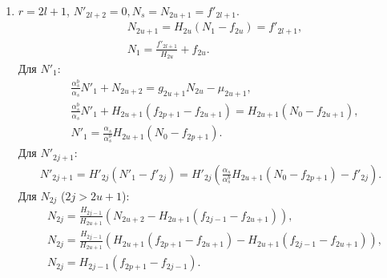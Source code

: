 \begin{enumerate}
\begin{enumerate}
\begin{enumerate}
            \item \( r=2l+1 \), \( N'_{2l+2} = 0, N_s = N_{2u+1} = f'_{2l+1} \).
            \begin{equation*}
                \begin{split}
                    & N_{2u+1} = H_{2u} (N_1 - f_{2u}) = f'_{2l+1}, \\
                    & N_1 = \frac{f'_{2l+1}}{H_{2u}} + f_{2u}.
                \end{split}
            \end{equation*}
            Для \(N'_{1}\):
            \begin{equation*}
                \begin{split}
                    & \frac{\alpha^b_s}{\alpha_s} N'_1 + N_{2u+2} = g_{2u+1} N_{2u} - \mu_{2u+1}, \\
                    & \frac{\alpha^b_s}{\alpha_s} N'_1 + H_{2u+1} (f_{2p+1} - f_{2u+1}) = H_{2u+1} (N_0 - f_{2u+1}), \\
                    & N'_1 = \frac{\alpha_s}{\alpha^b_s} H_{2u+1} (N_0 - f_{2p+1}).
                \end{split}
            \end{equation*}
            Для \(N'_{2j+1}\):
            \begin{equation*}
                \begin{split}
                    N'_{2j+1} = H'_{2j} (N'_1 - f'_{2j}) = H'_{2j} \left( \frac{\alpha_s}{\alpha^b_s} H_{2u+1} (N_0 - f_{2p+1}) - f'_{2j} \right).
                \end{split}
            \end{equation*}
            Для \(N_{2j}\) (\(2j > 2u+1\)):
            \begin{equation*}
                \begin{split}
                    & N_{2j} = \frac{H_{2j-1}}{H_{2u+1}} \left( N_{2u+2} - H_{2u+1} (f_{2j-1} - f_{2u+1}) \right), \\
                    & N_{2j} = \frac{H_{2j-1}}{H_{2u+1}} \left( H_{2u+1} (f_{2p+1} - f_{2u+1}) - H_{2u+1} (f_{2j-1} - f_{2u+1}) \right), \\
                    & N_{2j} = H_{2j-1} ( f_{2p+1} - f_{2j-1} ).
                \end{split}
            \end{equation*}
        \end{enumerate} %
    \end{enumerate} %
\end{enumerate} %